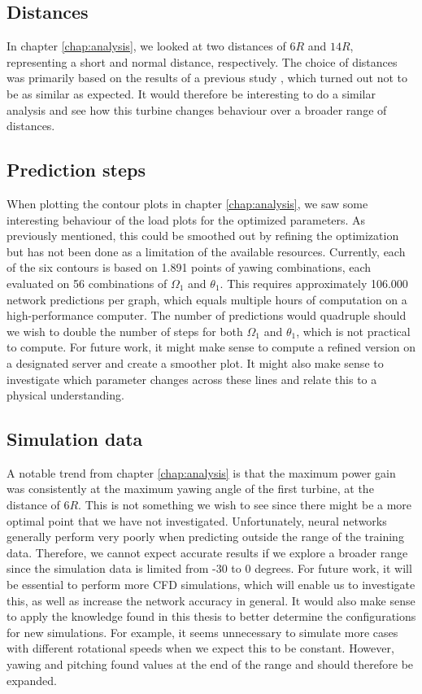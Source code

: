 \subsection{Distances}

In chapter \ref{chap:analysis}, we looked at two distances of $6R$ and $14R$, representing a short and normal distance, respectively. The choice of distances was primarily based on the results of a previous study \cite{charles}, which turned out not to be as similar as expected. It would therefore be interesting to do a similar analysis and see how this turbine changes behaviour over a broader range of distances. 



\subsection{Prediction steps}

When plotting the contour plots in chapter \ref{chap:analysis}, we saw some interesting behaviour of the load plots for the optimized parameters. As previously mentioned, this could be smoothed out by refining the optimization but has not been done as a limitation of the available resources. Currently, each of the six contours is based on 1.891 points of yawing combinations, each evaluated on 56 combinations of $\Omega_1$ and $\theta_1$. This requires approximately 106.000 network predictions per graph, which equals multiple hours of computation on a high-performance computer. The number of predictions would quadruple should we wish to double the number of steps for both $\Omega_1$ and $\theta_1$, which is not practical to compute. For future work, it might make sense to compute a refined version on a designated server and create a smoother plot. It might also make sense to investigate which parameter changes across these lines and relate this to a physical understanding. 

\subsection{Simulation data}
\label{sec:Simulation_discussion}

A notable trend from chapter \ref{chap:analysis} is that the maximum power gain was consistently at the maximum yawing angle of the first turbine, at the distance of $6R$. This is not something we wish to see since there might be a more optimal point that we have not investigated. Unfortunately, neural networks generally perform very poorly when predicting outside the range of the training data. Therefore, we cannot expect accurate results if we explore a broader range since the simulation data is limited from -30 to 0 degrees. For future work, it will be essential to perform more CFD simulations, which will enable us to investigate this, as well as increase the network accuracy in general. It would also make sense to apply the knowledge found in this thesis to better determine the configurations for new simulations. For example, it seems unnecessary to simulate more cases with different rotational speeds when we expect this to be constant. However, yawing and pitching found values at the end of the range and should therefore be expanded. 




